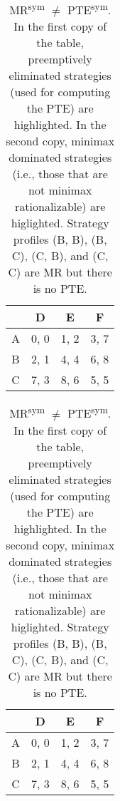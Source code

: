 \begin{table}
	\caption{
		MR\textsuperscript{sym} $\ne$ PTE\textsuperscript{sym}.
		In the first copy of the table, preemptively eliminated strategies (used for computing the PTE) are highlighted.
		In the second copy, minimax dominated strategies (i.e., those that are not minimax rationalizable) are higlighted.
		Strategy profiles (B, B), (B, C), (C, B), and (C, C) are MR but there is no PTE.
	}
	\label{tab:sym-mr-ne-pte}
	\centering
	\begin{tabular}{|c|c|c|c|}
		\hline
			& D		& E	   & F	  \\
		\hline
		A 		&\cellcolor{gray!80} 0, 0 &\cellcolor{gray!80} 1, 2 &\cellcolor{gray!80} 3, 7 \\
		\hline
		B		&\cellcolor{gray!80} 2, 1 &\cellcolor{gray!80} 4, 4 &\cellcolor{gray!20} 6, 8 \\
		\hline
		C		&\cellcolor{gray!80} 7, 3 &\cellcolor{gray!20} 8, 6 &\cellcolor{gray!50} 5, 5 \\
		\hline
	\end{tabular}
	\hspace{1em}
	\begin{tabular}{|c|c|c|c|}
		\hline
			& D		& E	   & F	  \\
		\hline
		A 		&\cellcolor{gray!80} 0, 0 &\cellcolor{gray!80} 1, 2 &\cellcolor{gray!80} 3, 7 \\
		\hline
		B		&\cellcolor{gray!80} 2, 1 &\cellcolor{gray!00} 4, 4 &\cellcolor{gray!00} 6, 8 \\
		\hline
		C		&\cellcolor{gray!80} 7, 3 &\cellcolor{gray!00} 8, 6 &\cellcolor{gray!00} 5, 5 \\
		\hline
	\end{tabular}
\end{table}

